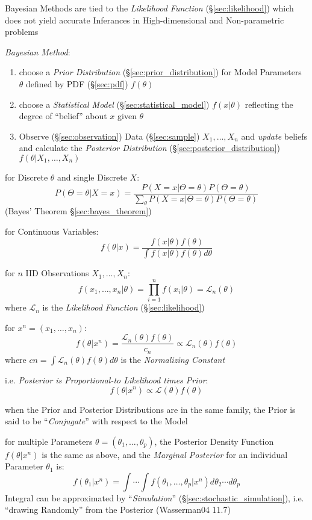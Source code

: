 \fist Bayesian Methods are tied to the \emph{Likelihood Function}
(\S\ref{sec:likelihood}) which does not yield accurate Inferances in
High-dimensional and Non-parametric problems

\emph{Bayesian Method}:
\begin{enumerate}
  \item choose a \emph{Prior Distribution} (\S\ref{sec:prior_distribution}) for
    Model Parameters $\theta$ defined by PDF (\S\ref{sec:pdf}) $f(\theta)$
  \item choose a \emph{Statistical Model} (\S\ref{sec:statistical_model})
    $f(x|\theta)$ reflecting the degree of ``belief'' about $x$ given $\theta$
  \item Observe (\S\ref{sec:observation}) Data (\S\ref{sec:sample})
    $X_1, \ldots, X_n$ and \emph{update} beliefs and calculate the
    \emph{Posterior Distribution} (\S\ref{sec:posterior_distribution})
    $f(\theta | X_1, \ldots, X_n)$
\end{enumerate}

for Discrete $\theta$ and single Discrete $X$:
\[
  P(\Theta = \theta | X = x) = \frac{
    P(X = x|\Theta = \theta)P(\Theta = \theta)
  }{
    \sum_\theta P(X = x | \Theta = \theta) P(\Theta = \theta)
  }
\]
(Bayes' Theorem \S\ref{sec:bayes_theorem})

for Continuous Variables:
\[
  f(\theta | x) = \frac{
    f(x|\theta)f(\theta)
  }{
    \int f(x|\theta)f(\theta) d\theta
  }
\]

for $n$ IID Observations $X_1, \ldots, X_n$:
\[
  f(x_1, \ldots, x_n | \theta) =
    \prod_{i=1}^n f(x_i | \theta) = \mathcal{L}_n(\theta)
\]
where $\mathcal{L}_n$ is the \emph{Likelihood Function} (\S\ref{sec:likelihood})

for $x^n = (x_1, \ldots, x_n)$:
\[
  f(\theta|x^n) = \frac{\mathcal{L}_n(\theta)f(\theta)}{c_n}
    \propto \mathcal{L}_n(\theta)f(\theta)
\]
where $cn = \int \mathcal{L}_n(\theta)f(\theta) d\theta$ is the
\emph{Normalizing Constant}

i.e. \emph{Posterior is Proportional-to Likelihood times Prior}:
\[
  f(\theta | x^n) \propto \mathcal{L}(\theta)f(\theta)
\]

when the Prior and Posterior Distributions are in the same family, the Prior is
said to be ``\emph{Conjugate}'' with respect to the Model

for multiple Parameters $\theta = (\theta_1, \ldots, \theta_p)$, the Posterior
Density Function $f(\theta|x^n)$ is the same as above, and the \emph{Marginal
  Posterior} for an individual Parameter $\theta_1$ is:
\[
  f(\theta_1 | x^n) =
    \int\cdots\int f(\theta_1,\ldots,\theta_p | x^n) d\theta_2 \cdots d\theta_p
\]
Integral can be approximated by ``\emph{Simulation}''
(\S\ref{sec:stochastic_simulation}), i.e. ``drawing Randomly'' from the
Posterior (Wasserman04 11.7)



